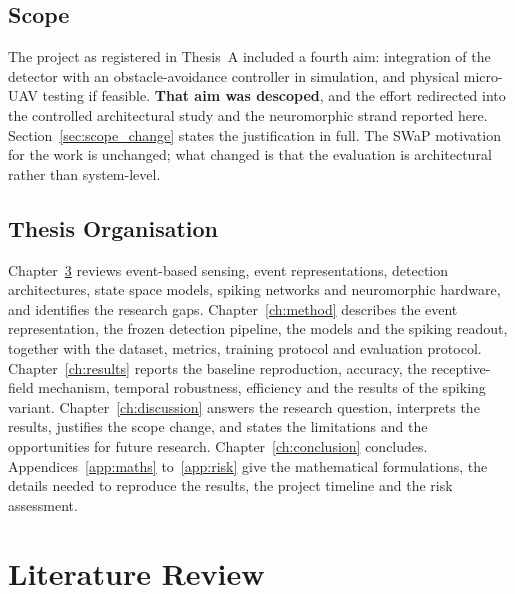 \documentclass[11pt, a4paper]{report}
\begin{document}
\section{Scope}
\label{sec:scope}
The project as registered in Thesis~A included a fourth aim: integration of the detector with an
obstacle-avoidance controller in simulation, and physical micro-UAV testing if feasible. \textbf{That
aim was descoped}, and the effort redirected into the controlled architectural study and the
neuromorphic strand reported here. Section~\ref{sec:scope_change} states the justification in full.
The SWaP motivation for the work is unchanged; what changed is that the evaluation is architectural
rather than system-level.

\section{Thesis Organisation}
\label{sec:organisation}
Chapter~\ref{ch:lit} reviews event-based sensing, event representations, detection architectures,
state space models, spiking networks and neuromorphic hardware, and identifies the research gaps.
Chapter~\ref{ch:method} describes the event representation, the frozen detection pipeline, the models
and the spiking readout, together with the dataset, metrics, training protocol and evaluation protocol.
Chapter~\ref{ch:results} reports the baseline reproduction, accuracy, the receptive-field mechanism, temporal
robustness, efficiency and the results of the spiking variant.
Chapter~\ref{ch:discussion} answers the research question, interprets the results, justifies the scope change,
and states the limitations and the opportunities for future research.
Chapter~\ref{ch:conclusion} concludes.
Appendices~\ref{app:maths} to~\ref{app:risk} give the mathematical formulations, the details needed to
reproduce the results, the project timeline and the risk assessment.

\chapter{Literature Review}
\label{ch:lit}
\end{document}
